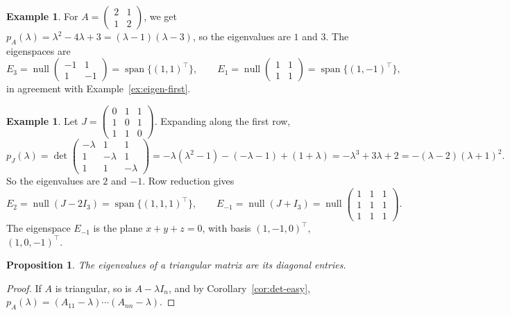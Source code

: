 \documentclass[11pt]{article}
\theoremstyle{definition}
\newtheorem{example}[definition]{Example}
\theoremstyle{plain}
\newtheorem{proposition}[definition]{Proposition}
\theoremstyle{remark}
\DeclareMathOperator{\Null}{null}
\DeclareMathOperator{\Span}{span}
\begin{document}
\begin{example}\label{ex:eigen-2x2}
    For $A = \begin{pmatrix} 2 & 1 \\ 1 & 2 \end{pmatrix}$, we get $p_A(\lambda) = \lambda^2 - 4\lambda + 3 = (\lambda - 1)(\lambda - 3)$, so the eigenvalues are $1$ and $3$. The eigenspaces are
    \[E_3 = \Null \begin{pmatrix} -1 & 1 \\ 1 & -1 \end{pmatrix} = \Span\{(1, 1)^\top\}, \qquad E_1 = \Null \begin{pmatrix} 1 & 1 \\ 1 & 1 \end{pmatrix} = \Span\{(1, -1)^\top\},\]
    in agreement with Example~\ref{ex:eigen-first}.
\end{example}

\begin{example}\label{ex:eigen-3x3}
    Let $J = \begin{pmatrix} 0 & 1 & 1 \\ 1 & 0 & 1 \\ 1 & 1 & 0 \end{pmatrix}$. Expanding along the first row,
    \[p_J(\lambda) = \det \begin{pmatrix} -\lambda & 1 & 1 \\ 1 & -\lambda & 1 \\ 1 & 1 & -\lambda \end{pmatrix} = -\lambda(\lambda^2 - 1) - (-\lambda - 1) + (1 + \lambda) = -\lambda^3 + 3\lambda + 2 = -(\lambda - 2)(\lambda + 1)^2.\]
    So the eigenvalues are $2$ and $-1$. Row reduction gives
    \[E_2 = \Null(J - 2I_3) = \Span\{(1, 1, 1)^\top\}, \qquad E_{-1} = \Null(J + I_3) = \Null \begin{pmatrix} 1 & 1 & 1 \\ 1 & 1 & 1 \\ 1 & 1 & 1 \end{pmatrix}.\]
    The eigenspace $E_{-1}$ is the plane $x + y + z = 0$, with basis $(1, -1, 0)^\top$, $(1, 0, -1)^\top$.
\end{example}

\begin{proposition}\label{prop:eigen-triangular}
    The eigenvalues of a triangular matrix are its diagonal entries.
\end{proposition}

\begin{proof}
    If $A$ is triangular, so is $A - \lambda I_n$, and by Corollary~\ref{cor:det-easy}, $p_A(\lambda) = (A_{11} - \lambda) \cdots (A_{nn} - \lambda)$.
\end{proof}
\end{document}
